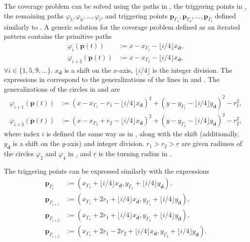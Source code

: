 The coverage problem can be solved using the paths in , the triggering points in , the remaining paths $\varphi_5,\varphi_6,\dots,\varphi_l$, and triggering points $\mathbf{p}_{\Gamma_5},\mathbf{p}_{\Gamma_6},\dots,\mathbf{p}_{\Gamma_l}$ defined similarly to . A generic solution for the coverage problem defined as an iterated pattern contains the primitive paths
\begin{subequations}\label{eq:line-gene}\begin{align}
  \varphi_i(\mathbf{p}(t))&:=x-x_{\Gamma_1}-\lfloor i/4\rfloor x_\mathbf{d},\\
  \varphi_{i+2}(\mathbf{p}(t))&:=x-x_{\Gamma_2}-\lfloor i/4\rfloor x_\mathbf{d},
\end{align}
\end{subequations}
$\forall i\in\{1,5,9,\dots\}$. $x_\mathbf{d}$ is a shift on the $x$-axis, $\lfloor i/4\rfloor$ is the integer division. The expressions in  correspond to the generalizations of the lines in  and . The generalizations of the circles in  and  are
\begin{subequations}\label{eq:circ-gene}\begin{align}
  \varphi_{i+1}(\mathbf{p}(t))&:=(x-x_{\Gamma_1}-r_1-\lfloor i/4\rfloor x_\mathbf{d})^2+(y-y_{\Gamma_1}-\lfloor i/4\rfloor y_\mathbf{d})^2-r_1^2,\\
  \varphi_{i+3}(\mathbf{p}(t))&:=(x-x_{\Gamma_2}+r_2-\lfloor i/4\rfloor x_\mathbf{d})^2+(y-y_{\Gamma_3}-\lfloor i/4\rfloor y_\mathbf{d})^2-r_2^2,\label{eq:second-circ-gene}
\end{align}
\end{subequations}
where index $i$ is defined the same way as in , along with the shift (additionally, $y_\mathbf{d}$ is a shift on the $y$-axis) and integer division. $r_1>r_2>\underline{r}$ are given radiuses of the circles $\varphi_2$ and $\varphi_4$ in , and $\underline{r}$ is the turning radius in .

The triggering points can be expressed similarly with the expressions
\begin{subequations}\label{eq:trigs-gene}\begin{align}
  \mathbf{p}_{\Gamma_i}&:=(x_{\Gamma_1}+\lfloor i/4\rfloor x_\mathbf{d},y_{\Gamma_1}+\lfloor i/4\rfloor y_\mathbf{d}),\\
  \mathbf{p}_{\Gamma_{i+1}}&:=(x_{\Gamma_1}+2r_1+\lfloor i/4\rfloor x_\mathbf{d},y_{\Gamma_1}+\lfloor i/4\rfloor y_\mathbf{d}),\\
  \mathbf{p}_{\Gamma_{i+2}}&:=(x_{\Gamma_1}+2r_1+\lfloor i/4\rfloor x_\mathbf{d},y_{\Gamma_3}+\lfloor i/4\rfloor y_\mathbf{d}),\\
  \mathbf{p}_{\Gamma_{i+3}}&:=(x_{\Gamma_1}+2r_1-2r_2+\lfloor i/4\rfloor x_\mathbf{d},y_{\Gamma_3}+\lfloor i/4\rfloor y_\mathbf{d})\label{eq:last-trig-gene}.
\end{align}
\end{subequations}

